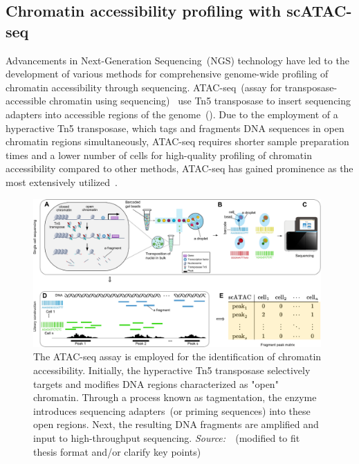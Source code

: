\subsection{Chromatin accessibility profiling with scATAC-seq}
\label{background:sec1:scATAC}

Advancements in Next-Generation Sequencing~(NGS) technology have led to the development of various methods for comprehensive genome-wide profiling of chromatin accessibility through sequencing. ATAC-seq~(assay for transposase-accessible chromatin using sequencing)~\citep{buenrostro2013atacseq} use Tn5 transposase to insert sequencing adapters into accessible regions of the genome~(). Due to the employment of a hyperactive Tn5 transposase, which tags and fragments DNA sequences in open chromatin regions simultaneously, ATAC-seq requires shorter sample preparation times and a lower number of cells for high-quality profiling of chromatin accessibility compared to other methods, ATAC-seq has gained prominence as the most extensively utilized~\citep{minnoye2021chromatin}.

\begin{figure}[!ht]
	\centering
	\includegraphics[width=0.98\textwidth]{scATAC-seq/fig}
	\vspace{0.1cm}
	\caption[ATAC sequenceing schematic flow.]{The ATAC-seq assay is employed for the identification of chromatin accessibility. Initially, the hyperactive Tn5 transposase selectively targets and modifies DNA regions characterized as "open" chromatin. Through a process known as tagmentation, the enzyme introduces sequencing adapters~(or priming sequences) into these open regions. Next, the resulting DNA fragments are amplified and input to high-throughput sequencing. \emph{Source:~\cite{yan2020reads}}~(modified to fit thesis format and/or clarify key points)}
	\label{fig:ATAC-seq}
\end{figure}

